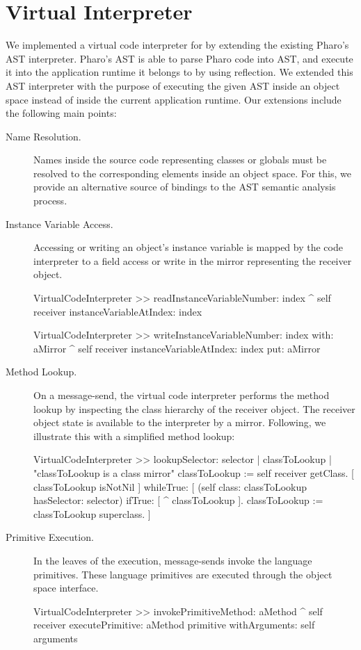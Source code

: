 \section{\Vtt Virtual Interpreter}%

We implemented a virtual code interpreter for \Vtt by extending the existing Pharo's AST interpreter. Pharo's AST is able to parse Pharo code into AST, and execute it into the application runtime it belongs to by using reflection. We extended this AST interpreter with the purpose of executing the given AST inside an object space instead of inside the current application runtime. Our extensions include the following main points:

\begin{description}
\item[Name Resolution.] Names inside the source code representing \eg classes or globals must be resolved to the corresponding elements inside an object space. For this, we provide an alternative source of bindings to the AST semantic analysis process.

\item[Instance Variable Access.] Accessing or writing an object's instance variable is mapped by the code interpreter to a field access or write in the mirror representing the receiver object.

\begin{code}
VirtualCodeInterpreter >> readInstanceVariableNumber: index
    ^ self receiver instanceVariableAtIndex: index
    
VirtualCodeInterpreter >> writeInstanceVariableNumber: index with: aMirror
    ^ self receiver instanceVariableAtIndex: index put: aMirror
\end{code}

\item[Method Lookup.] On a message-send, the virtual code interpreter performs the method lookup by inspecting the class hierarchy of the receiver object. The receiver object state is available to the interpreter by a mirror. Following, we illustrate this with a simplified method lookup:

\begin{code}
VirtualCodeInterpreter >> lookupSelector: selector
    | classToLookup |
    "classToLookup is a class mirror"
    classToLookup := self receiver getClass.
    [ classToLookup isNotNil ] whileTrue: [
        (self class: classToLookup hasSelector: selector)
        	    ifTrue: [ ^ classToLookup ].
	classToLookup := classToLookup superclass.
    ]
\end{code}

\item[Primitive Execution.] In the leaves of the execution, message-sends invoke the language primitives. These language primitives are executed through the object space interface.

\begin{code}
VirtualCodeInterpreter >> invokePrimitiveMethod: aMethod
    ^ self receiver
         executePrimitive: aMethod primitive
         withArguments: self arguments
\end{code}

\end{description}

